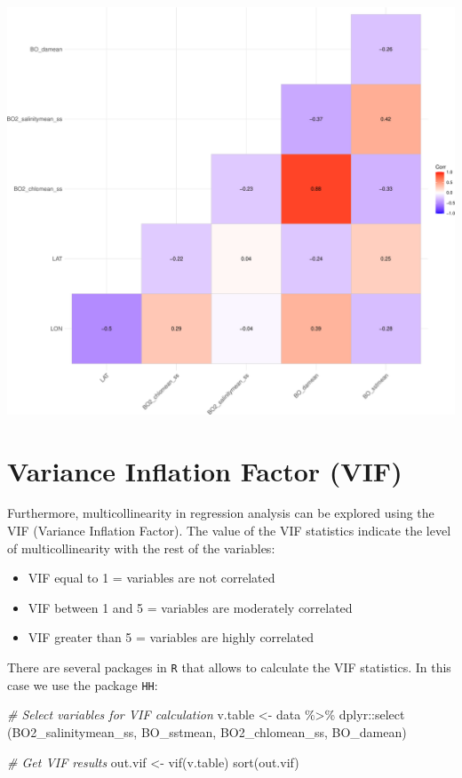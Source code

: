 \documentclass[
]{book}
\newenvironment{Shaded}{\begin{snugshade}}{\end{snugshade}}
\newcommand{\CommentTok}[1]{\textcolor[rgb]{0.56,0.35,0.01}{\textit{#1}}}
\newcommand{\FunctionTok}[1]{\textcolor[rgb]{0.00,0.00,0.00}{#1}}
\newcommand{\NormalTok}[1]{#1}
\newcommand{\OtherTok}[1]{\textcolor[rgb]{0.56,0.35,0.01}{#1}}
\newcommand{\SpecialCharTok}[1]{\textcolor[rgb]{0.00,0.00,0.00}{#1}}
\providecommand{\tightlist}{%
  \setlength{\itemsep}{0pt}\setlength{\parskip}{0pt}}
\begin{document}
\includegraphics{_main_files/figure-latex/unnamed-chunk-51-1.pdf}

\hypertarget{variance-inflation-factor-vif}{%
\section{Variance Inflation Factor (VIF)}\label{variance-inflation-factor-vif}}

Furthermore, multicollinearity in regression analysis can be explored using the VIF (Variance Inflation Factor). The value of the VIF statistics indicate the level of multicollinearity with the rest of the variables:

\begin{itemize}
\tightlist
\item
  VIF equal to 1 = variables are not correlated
\item
  VIF between 1 and 5 = variables are moderately correlated
\item
  VIF greater than 5 = variables are highly correlated
\end{itemize}

There are several packages in \texttt{R} that allows to calculate the VIF statistics. In this case we use the package \texttt{HH}:

\begin{Shaded}
\begin{Highlighting}[]
\CommentTok{\# Select variables for VIF calculation}
\NormalTok{v.table }\OtherTok{\textless{}{-}}\NormalTok{ data }\SpecialCharTok{\%\textgreater{}\%} 
\NormalTok{  dplyr}\SpecialCharTok{::}\FunctionTok{select}\NormalTok{ (BO2\_salinitymean\_ss, BO\_sstmean, BO2\_chlomean\_ss, BO\_damean)}

\CommentTok{\# Get VIF results}
\NormalTok{out.vif }\OtherTok{\textless{}{-}} \FunctionTok{vif}\NormalTok{(v.table)}
\FunctionTok{sort}\NormalTok{(out.vif)}
\end{Highlighting}
\end{Shaded}
\end{document}
